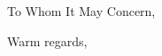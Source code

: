 \documentclass[a4paper,11pt]{letter}
\begin{document}
\onehalfspacing
\begin{letter}{}
\address{IRIS Adlershof\\Humboldt-Universität zu Berlin\\Zum Großen Windkanal 2\\12489 Berlin, Germany}
\opening{To Whom It May Concern,}
\signature{Dr. Theodore Chang}
\closing{Warm regards,}
\end{letter}
\clearpage
\end{document}
